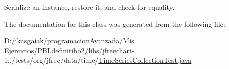 Serialize an instance, restore it, and check for equality. 

The documentation for this class was generated from the following file\+:\begin{DoxyCompactItemize}
\item 
D\+:/ikasgaiak/programacion\+Avanzada/\+Mis Ejercicios/\+P\+B\+Ldefinitibo2/libs/jfreechart-\/1../tests/org/jfree/data/time/\mbox{\hyperlink{_time_series_collection_test_8java}{Time\+Series\+Collection\+Test.\+java}}\end{DoxyCompactItemize}

